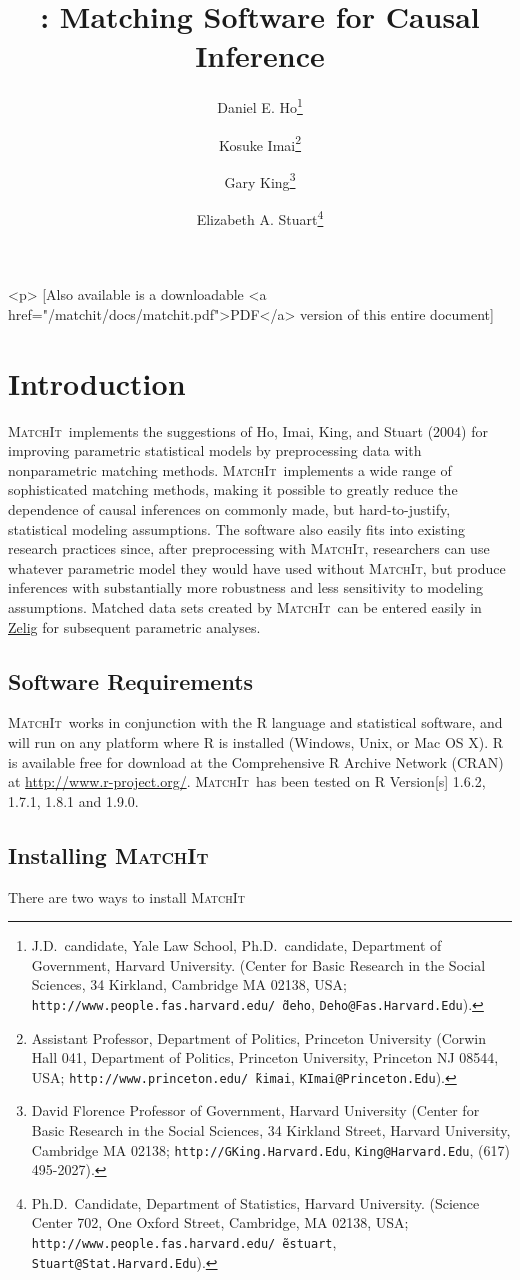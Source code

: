 \documentclass[oneside,letterpaper,titlepage]{article}
\title{\MatchIt : Matching Software for Causal Inference}
\author{Daniel E. Ho\thanks{J.D.\ candidate, Yale Law School, Ph.D.\
    candidate, Department of Government, Harvard
    University. (Center for Basic Research in the Social Sciences, 34
    Kirkland, Cambridge MA 02138, USA;
    \texttt{http://www.people.fas.harvard.edu/\~\,deho},
    \texttt{Deho@Fas.Harvard.Edu}).}
\and %
Kosuke Imai\thanks{Assistant Professor, Department of Politics, Princeton
    University (Corwin Hall 041, Department of Politics, Princeton
    University, Princeton NJ 08544, USA;
    \texttt{http://www.princeton.edu/\~\,kimai},
    \texttt{KImai@Princeton.Edu}).}
\and %
Gary King\thanks{David Florence Professor of Government, Harvard
  University (Center for Basic Research in the Social Sciences, 34
  Kirkland Street, Harvard University, Cambridge MA 02138;
  \texttt{http://GKing.Harvard.Edu}, \texttt{King@Harvard.Edu}, (617)
  495-2027).}
\and %
Elizabeth A. Stuart\thanks{Ph.D.\ Candidate, Department of Statistics, Harvard
  University. (Science Center 702, One Oxford Street, Cambridge, MA
  02138, USA;
  \texttt{http://www.people.fas.harvard.edu/\~\,estuart},
  \texttt{Stuart@Stat.Harvard.Edu}).}}
\newcommand{\MatchIt}{\textsc{MatchIt}}
\begin{document}
\maketitle

\begin{rawhtml}
<p>
  [Also available is a downloadable <a href="/matchit/docs/matchit.pdf">PDF</a>
  version of this entire document]
\end{rawhtml}

\tableofcontents

\section{Introduction}
\MatchIt\ implements the suggestions of Ho, Imai, King, and Stuart
(2004) for improving parametric statistical models by preprocessing
data with nonparametric matching methods.  \MatchIt\ implements a wide
range of sophisticated matching methods, making it possible to greatly
reduce the dependence of causal inferences on commonly made, but
hard-to-justify, statistical modeling assumptions.  The software also
easily fits into existing research practices since, after
preprocessing with \MatchIt, researchers can use whatever parametric
model they would have used without \MatchIt, but produce inferences
with substantially more robustness and less sensitivity to modeling
assumptions.  Matched data sets created by \MatchIt\ can be entered
easily in \href{http://gking.harvard.edu/zelig/}{Zelig} for subsequent
parametric analyses.


\subsection{Software Requirements} 
\MatchIt\ works in conjunction with the R language and statistical
software, and will run on any platform where R is installed (Windows,
Unix, or Mac OS X).  R is available free for download at the
Comprehensive R Archive Network (CRAN) at
\href{http://www.r-project.org/}{http://www.r-project.org/}.
\MatchIt\ has been tested on R Version[s] 1.6.2, 1.7.1, 1.8.1 and
1.9.0.

\subsection{Installing \MatchIt} 

There are two ways to install \MatchIt\: 
\end{document}
